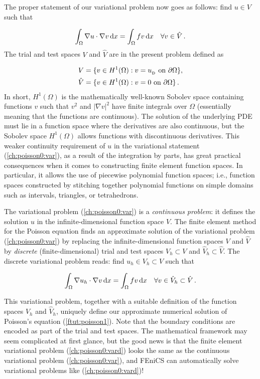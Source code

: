 \documentclass[graybox,envcountchap,sectrefs,final]{svmonodo}
\begin{document}
The proper statement of
our variational problem now goes as follows:
find $u \in V$ such that

\begin{equation} \label{ch:poisson0:var}
  \int_{\Omega} \nabla u \cdot \nabla v \dx =
  \int_{\Omega} fv \dx
  \quad \forall v \in \hat{V}\tp
\end{equation}
The trial and test spaces $V$ and $\hat V$ are in the present
problem defined as

\begin{align*}
     V      &= \{v \in H^1(\Omega) : v = \ub \mbox{ on } \partial\Omega\}, \\
    \hat{V} &= \{v \in H^1(\Omega) : v = 0 \mbox{ on } \partial\Omega\}\tp
\end{align*}
In short, $H^1(\Omega)$ is the mathematically well-known Sobolev space
containing functions $v$ such that $v^2$ and $|\nabla v|^2$ have
finite integrals over $\Omega$ (essentially meaning that the functions
are continuous). The solution of the underlying PDE must lie in a
function space where the derivatives are also continuous, but the
Sobolev space $H^1(\Omega)$ allows functions with discontinuous
derivatives. This weaker continuity requirement of $u$ in the
variational statement (\ref{ch:poisson0:var}), as a result of the
integration by parts, has great practical consequences when it comes
to constructing finite element function spaces. In particular, it
allows the use of piecewise polynomial function spaces; i.e., function
spaces constructed by stitching together polynomial functions on simple
domains such as intervals, triangles, or tetrahedrons.

The variational problem (\ref{ch:poisson0:var}) is a \emph{continuous
problem}: it defines the solution $u$ in the infinite-dimensional
function space $V$. The finite element method for the Poisson equation
finds an approximate solution of the variational problem
(\ref{ch:poisson0:var}) by replacing the infinite-dimensional function
spaces $V$ and $\hat{V}$ by \emph{discrete} (finite-dimensional) trial and
test spaces $V_h\subset{V}$ and $\hat{V}_h\subset\hat{V}$. The discrete variational problem reads: find $u_h \in
V_h \subset V$ such that

\begin{equation} \label{ch:poisson0:vard}
  \int_{\Omega} \nabla u_h \cdot \nabla v \dx =
  \int_{\Omega} fv \dx
  \quad \forall v \in \hat{V}_h \subset \hat{V}\tp
\end{equation}

This variational problem, together with a suitable definition of the
function spaces $V_h$ and $\hat{V}_h$, uniquely define our approximate
numerical solution of Poisson's equation (\ref{ftut:poisson1}). Note
that the boundary conditions are encoded as part of the trial and test
spaces. The mathematical framework may seem complicated at first
glance, but the good news is that the finite element variational
problem (\ref{ch:poisson0:vard}) looks the same as the continuous
variational problem (\ref{ch:poisson0:var}), and FEniCS can
automatically solve variational problems like (\ref{ch:poisson0:vard})!
\end{document}
